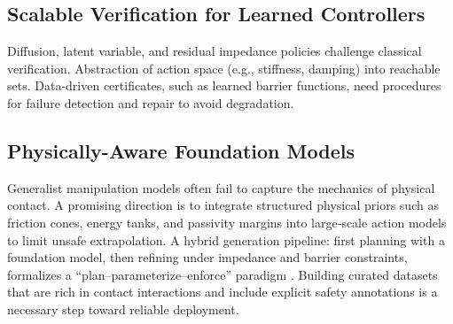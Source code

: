 \documentclass[Afour,sageh,times]{template/sagej}
\begin{document}
    \subsection{Scalable Verification for Learned Controllers}
    Diffusion, latent variable, and residual impedance policies challenge classical verification.
    Abstraction of action space (e.g., stiffness, damping) into reachable sets. Data-driven
    certificates, such as learned barrier functions, need procedures for failure detection and repair to avoid degradation.
    
    \subsection{Physically-Aware Foundation Models}
    Generalist manipulation models often fail to capture the mechanics of physical contact. A promising direction is to integrate structured physical priors such as friction cones, energy tanks, and passivity margins into large‑scale action models to limit unsafe extrapolation. A hybrid generation pipeline: first planning with a foundation model, then refining under impedance and barrier constraints, formalizes a “plan–parameterize–enforce” paradigm \citep{100,330}. Building curated datasets that are rich in contact interactions and include explicit safety annotations is a necessary step toward reliable deployment.
    
\end{document}
